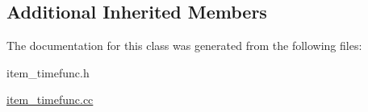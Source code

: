 \subsection*{Additional Inherited Members}


The documentation for this class was generated from the following files\+:\begin{DoxyCompactItemize}
\item 
item\+\_\+timefunc.\+h\item 
\mbox{\hyperlink{item__timefunc_8cc}{item\+\_\+timefunc.\+cc}}\end{DoxyCompactItemize}

